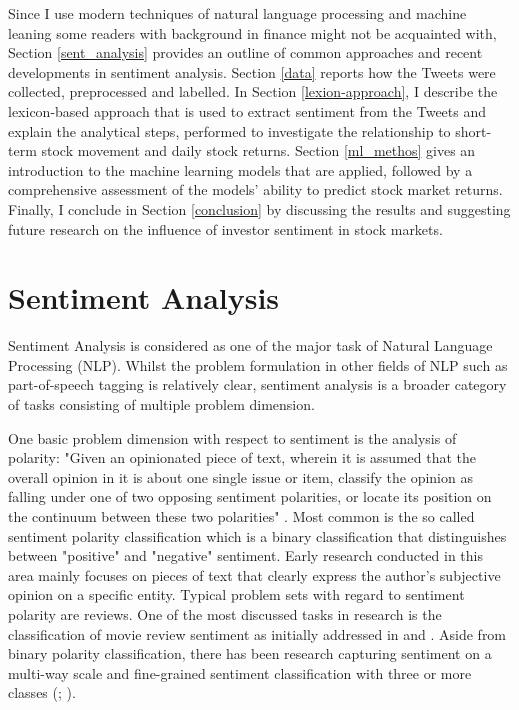 \documentclass[a4paper,12pt]{article}%
\begin{document}
Since I use modern techniques of natural language processing and machine leaning some readers with background in finance might not be acquainted with, Section \ref{sent_analysis} provides an outline of common approaches and recent developments in sentiment analysis. Section \ref{data} reports how the Tweets were collected, preprocessed and labelled. In Section \ref{lexion-approach}, I describe the lexicon-based  approach that is used to extract sentiment from the Tweets and explain the analytical steps, performed to investigate the relationship to short-term stock movement and daily stock returns. Section \ref{ml_methos} gives an introduction to the machine learning models that are applied, followed by a comprehensive assessment of the models' ability to predict stock market returns. Finally, I conclude in Section \ref{conclusion} by discussing the results and suggesting future research on the influence of investor sentiment in stock markets.


\section{Sentiment Analysis \label{sent_analysis}}
Sentiment Analysis is considered as one of the major task of Natural Language Processing (NLP). Whilst the problem formulation in other fields of NLP such as part-of-speech tagging is relatively clear, sentiment analysis is a broader category of tasks consisting of multiple problem dimension. 

One basic problem dimension with respect to sentiment is the analysis of polarity: "Given an opinionated piece of text, wherein it is assumed that the overall opinion in it is about one single issue or item, classify the opinion as falling under one of two opposing sentiment polarities, or locate its position on the continuum between these two polarities" \citep{Pang.2008}. Most common is the so called sentiment polarity classification which is a binary classification that distinguishes between "positive" and "negative" sentiment. Early research conducted in this area mainly focuses on pieces of text that clearly express the author's subjective opinion on a specific entity. Typical problem sets with regard to sentiment polarity are reviews. One of the most discussed tasks in research is the classification of movie review sentiment as initially addressed in \citet{Pang2002} and \citet{Turney2002}.
Aside from binary polarity classification, there has been research capturing sentiment on a multi-way scale \citep{Snyder2007a} and fine-grained sentiment classification with three or more classes (\cite{Pang2005}; \cite{Socher2013}).
\end{document}
